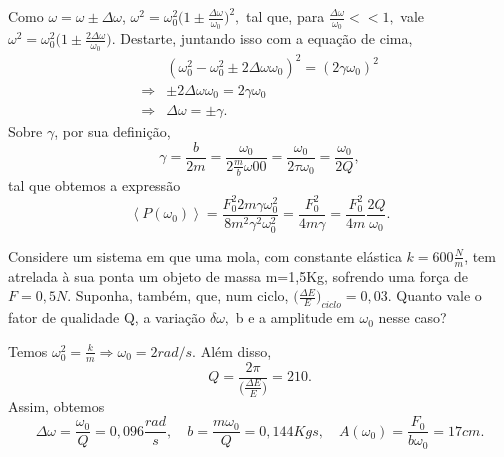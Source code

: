 \documentclass[physicsII_notes.tex]{subfiles}
\begin{document}
Como \(\omega = \omega \pm \Delta \omega \), \(\omega^{2} = \omega_{0}^{2}\biggl(1\pm \frac{\Delta \omega }{\omega_{0}}\biggr)^{2},\) tal que, para \(\frac{\Delta \omega }{\omega_{0}} <<1,\)
vale \(\omega ^{2} = \omega_{0}^{2}\biggl(1 \pm \frac{2\Delta \omega }{\omega_{0}}\biggr).\) Destarte, juntando isso com a equação de cima,
\begin{align*}
	            & (\omega_{0}^{2}-\omega_{0}^{2}\pm 2\Delta \omega \omega_{0})^{2} = (2\gamma \omega_{0})^{2} \\
	\Rightarrow & \pm 2\Delta \omega \omega_{0} = 2\gamma \omega_{0}                                          \\
	\Rightarrow & \Delta \omega = \pm\gamma .
\end{align*}
Sobre \(\gamma \), por sua definição,
\[
	\gamma = \frac{b}{2m} = \frac{\omega_{0}}{2\frac{m}{b}\omega 00} = \frac{\omega_{0}}{2\tau \omega_{0}} = \frac{\omega_{0}}{2Q},
\]
tal que obtemos a expressão
\[
	\left< P(\omega_{0}) \right> = \frac{F_{0}^{2}2m\gamma \omega_{0}^{2}}{8m^{2}\gamma^{2}\omega_{0}^{2}} = \frac{F_{0}^{2}}{4m\gamma } = \frac{F_{0}^{2}}{4m}\frac{2Q}{\omega_{0}}.
\]
\begin{example}
	Considere um sistema em que uma mola, com constante elástica \(k = 600 \frac{N}{m}\), tem atrelada à sua ponta um objeto de massa m=1,5Kg, sofrendo uma força de
	\(F=0,5N\). Suponha, também, que, num ciclo, \(\biggl(\frac{\Delta E}{E}\biggr)_{ciclo}=0,03\). Quanto vale o fator de qualidade Q, a variação \(\delta \omega ,\) b e a amplitude em \(\omega_{0}\) nesse caso?

	Temos \(\omega_{0}^{2} = \frac{k}{m} \Rightarrow \omega_{0} = 2rad/s\). Além disso,
	\[
		Q = \frac{2\pi }{\biggl(\frac{\Delta E}{E}\biggr)} = 210.
	\]
	Assim, obtemos
	\[
		\Delta \omega  = \frac{\omega_{0}}{Q} = 0,096\frac{rad}{s},\quad b = \frac{m\omega_{0}}{Q} = 0,144 Kg\dot{}s,\quad A(\omega_{0}) = \frac{F_{0}}{b\omega_{0}} =17cm.
	\]
\end{example}
\end{document}
